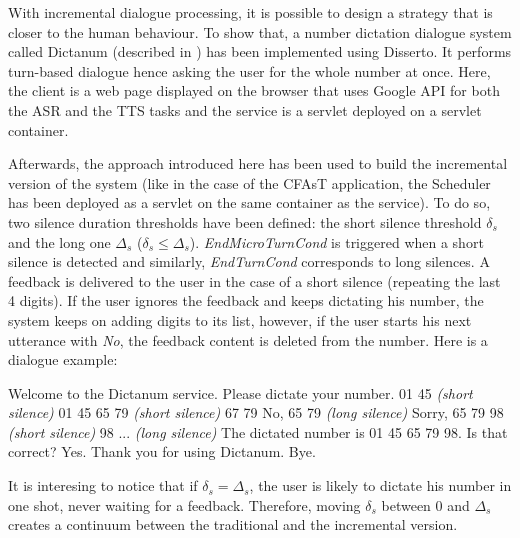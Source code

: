         With incremental dialogue processing, it is possible to design a strategy that is closer to the human behaviour. To show that, a number dictation dialogue system called Dictanum (described in \cite{Khouzaimi2014c})  has been implemented using Disserto. It performs turn-based dialogue hence asking the user for the whole number at once. Here, the client is a web page displayed on the browser that uses Google API for both the ASR and the TTS tasks and the service is a servlet deployed on a servlet container.
        
        Afterwards, the approach introduced here has been used to build the incremental version of the system (like in the case of the CFAsT application, the Scheduler has been deployed as a servlet on the same container as the service). To do so, two silence duration thresholds have been defined: the short silence threshold $\delta_s$ and the long one $\Delta_s$ ($\delta_s \leq \Delta_s$). \textit{EndMicroTurnCond} is triggered when a short silence is detected and similarly, \textit{EndTurnCond} corresponds to long silences. A feedback is delivered to the user in the case of a short silence (repeating the last 4 digits). If the user ignores the feedback and keeps dictating his number, the system keeps on adding digits to its list, however, if the user starts his next utterance with \textit{No}, the feedback content is deleted from the number. Here is a dialogue example:
        
        \begin{dialogue}
       	     Welcome to the Dictanum service. Please dictate your number.
             01 45 \textit{(short silence)}
             01 45
             65 79 \textit{(short silence)}
             67 79
             No, 65 79 \textit{(long silence)}
             Sorry, 65 79
             98 \textit{(short silence)}
             98
             ... \textit{(long silence)}
             The dictated number is 01 45 65 79 98. Is that correct?
             Yes.
             Thank you for using Dictanum. Bye.
        \end{dialogue}

        It is interesing to notice that if $\delta_s = \Delta_s$, the user is likely to dictate his number in one shot, never waiting for a feedback. Therefore, moving $\delta_s$ between 0 and $\Delta_s$ creates a continuum between the traditional and the incremental version.
        
